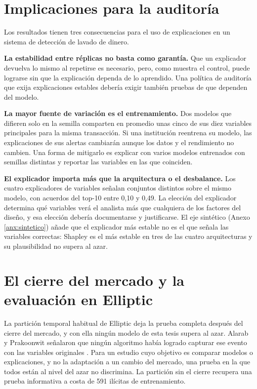 \section{Implicaciones para la auditoría}\label{sec:dis_auditoria}

Los resultados tienen tres consecuencias para el uso de explicaciones en un sistema de
detección de lavado de dinero.

\textbf{La estabilidad entre réplicas no basta como garantía.} Que un explicador devuelva lo
mismo al repetirse es necesario, pero, como muestra el control, puede lograrse sin que la
explicación dependa de lo aprendido. Una política de auditoría que exija explicaciones estables
debería exigir también pruebas de que dependen del modelo.

\textbf{La mayor fuente de variación es el entrenamiento.} Dos modelos que difieren solo en la
semilla comparten en promedio unas cinco de sus diez variables principales para la misma
transacción. Si una institución reentrena su modelo, las explicaciones de sus alertas cambiarán
aunque los datos y el rendimiento no cambien. Una forma de mitigarlo es explicar con varios
modelos entrenados con semillas distintas y reportar las variables en las que coinciden.

\textbf{El explicador importa más que la arquitectura o el desbalance.} Los cuatro explicadores
de variables señalan conjuntos distintos sobre el mismo modelo, con acuerdos del top-10 entre
0,10 y 0,49. La elección del explicador determina qué variables verá el analista más que
cualquiera de los factores del diseño, y esa elección debería documentarse y justificarse. El
eje sintético (Anexo \ref{anx:sintetico}) añade que el explicador más estable no es el que
señala las variables correctas: Shapley es el más estable en tres de las cuatro arquitecturas y
su plausibilidad no supera al azar.

\section{El cierre del mercado y la evaluación en Elliptic}\label{sec:dis_cierre}

La partición temporal habitual de Elliptic deja la prueba completa después del cierre del
mercado, y con ella ningún modelo de esta tesis supera al azar. Alarab y Prakoonwit señalaron
que ningún algoritmo había logrado capturar ese evento con las variables originales
\cite{Alarab2023Recurrent}. Para un estudio cuyo objetivo es comparar modelos o explicaciones, y
no la adaptación a un cambio del mercado, una prueba en la que todos están al nivel del azar no
discrimina. La partición sin el cierre recupera una prueba informativa a costa de 591 ilícitas de
entrenamiento.

